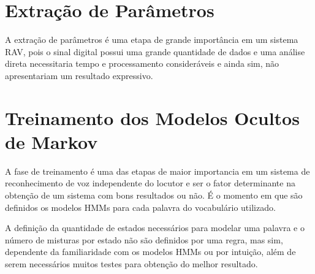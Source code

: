 \section{Extração de Parâmetros} 
A extração de parâmetros é uma etapa de grande importância em um sistema RAV, pois o sinal digital possui uma grande quantidade de dados e uma análise direta necessitaria tempo e processamento consideráveis e ainda sim, não apresentariam um resultado expressivo. 


\section{Treinamento dos Modelos Ocultos de Markov}
A fase de treinamento é uma das etapas de maior importancia em um sistema de reconhecimento de voz independente do locutor e ser o fator determinante na obtenção de um sistema com bons resultados ou não. É o momento em que são definidos os modelos HMMs para cada palavra do vocabulário utilizado.

A definição da quantidade de estados necessários para modelar uma palavra e o número de misturas por estado não são definidos por uma regra, mas sim, dependente da familiaridade com os modelos HMMs ou por intuição, além de serem necessários muitos testes para obtenção do melhor resultado. 





 






